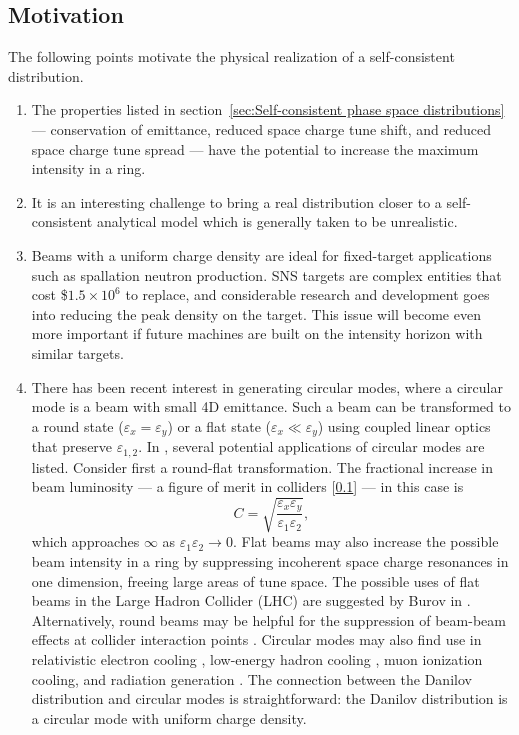 \subsection{Motivation}

The following points motivate the physical realization of a self-consistent distribution.

\begin{enumerate}
\item 
The properties listed in section~\ref{sec:Self-consistent phase space distributions} — conservation of emittance, reduced space charge tune shift, and reduced space charge tune spread — have the potential to increase the maximum intensity in a ring.

\item
It is an interesting challenge to bring a real distribution closer to a self-consistent analytical model which is generally taken to be unrealistic. 

\item
Beams with a uniform charge density are ideal for fixed-target applications such as spallation neutron production. SNS targets are complex entities that cost \$$1.5 \times 10^6$ to replace, and considerable research and development goes into reducing the peak density on the target. This issue will become even more important if future machines are built on the intensity horizon with similar targets.

\item
There has been recent interest in generating circular modes, where a circular mode is a beam with small 4D emittance. Such a beam can be transformed to a round state ($\varepsilon_x = \varepsilon_y$) or a flat state ($\varepsilon_x \ll \varepsilon_y$) using coupled linear optics that preserve $\varepsilon_{1,2}$. In \cite{Burov2002}, several potential applications of circular modes are listed. Consider first a round-flat transformation. The fractional increase in beam luminosity — a figure of merit in colliders [\ref{}] — in this case is
%
\begin{equation}
    C = \sqrt{\frac{\varepsilon_x\varepsilon_y}{\varepsilon_1\varepsilon_2}},
\end{equation}
%
which approaches $\infty$ as $\varepsilon_1\varepsilon_2 \rightarrow 0$. Flat beams may also increase the possible beam intensity in a ring by suppressing incoherent space charge resonances in one dimension, freeing large areas of tune space. The possible uses of flat beams in the Large Hadron Collider (LHC) are suggested by Burov in \cite{Burov2013}. Alternatively, round beams may be helpful for the suppression of beam-beam effects at collider interaction points \cite{Danilo1996}. Circular modes may also find use in relativistic electron cooling \cite{Burov2000}, low-energy hadron cooling \cite{Derbenev2000}, muon ionization cooling, and radiation generation \cite{Corlett2001}. The connection between the Danilov distribution and circular modes is straightforward: the Danilov distribution is a circular mode with uniform charge density. 

\end{enumerate}

